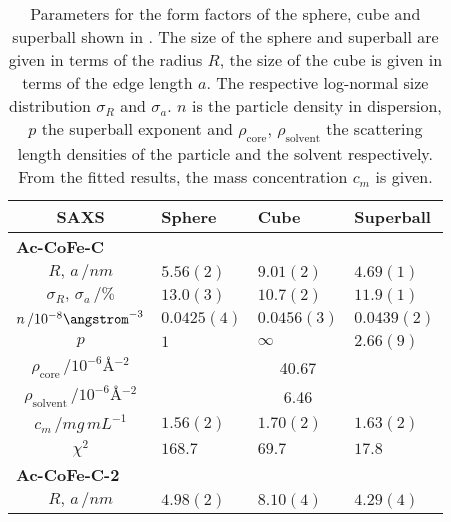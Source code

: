 \documentclass[\main/dresen_thesis.tex]{subfiles}
\begin{document}
    \begin{table}[!htbp]
      \centering
      \caption{\label{tab:monolayers:nanoparticle:saxs:shapeModelStudy}Parameters for the form factors of the sphere, cube and superball shown in .
      The size of the sphere and superball are given in terms of the radius $R$, the size of the cube is given in terms of the edge length $a$.
      The respective log-normal size distribution $\sigma_R$ and $\sigma_a$. $n$ is the particle density in dispersion, $p$ the superball exponent and $\rho_\mathrm{core}$, $\rho_\mathrm{solvent}$ the scattering length densities of the particle and the solvent respectively. From the fitted results, the mass concentration $c_m$ is given.}
      \begin{tabular}{ c | l | l | l }
        \textbf{SAXS}  & \textbf{Sphere} & \textbf{Cube} & \textbf{Superball}\\
        \hline
          \multicolumn{4}{l}{\textbf{Ac-CoFe-C}}\\
        \hline
        \rule{0pt}{2ex} $R, \, a \, / \unit{nm}$                      & $5.56(2)$      & $9.01(2)$  & $4.69(1)$\\
        \rule{0pt}{2ex} $\sigma_R, \, \sigma_a \, / \unit{\%}$        & $13.0(3)$      & $10.7(2)$  & $11.9(1)$\\
        \rule{0pt}{2ex} $n \, / 10^{-8} \angstrom^{-3}$               & $0.0425(4)$    & $0.0456(3)$& $0.0439(2)$\\
        \rule{0pt}{2ex} $p$                                           & $1$            & $\infty$   & $2.66(9)$\\
        \hline
        \rule{0pt}{2ex} $\rho_\mathrm{core}    \, / \unit{10^{-6} \angstrom^{-2}}$     & \multicolumn{3}{c}{40.67}\\
        \rule{0pt}{2ex} $\rho_\mathrm{solvent} \, / \unit{10^{-6} \angstrom^{-2}}$     & \multicolumn{3}{c}{6.46}\\
        \hline
        \rule{0pt}{2ex} $c_m \, / \unit{mg\, mL^{-1}}$                & $1.56(2)$      & $1.70(2)$  & $1.63(2)$\\
        \hline
        \rule{0pt}{2ex} $\chi^2$                                      & $168.7$        & $69.7$     & $17.8$\\
        \hline
        \hline
        \multicolumn{4}{l}{\textbf{Ac-CoFe-C-2}}\\
        \hline
        \rule{0pt}{2ex} $R, \, a \, / \unit{nm}$                      & $4.98(2)$      & $8.10(4)$  & $4.29(4)$\\

\end{tabular}
\end{table}
\end{document}
